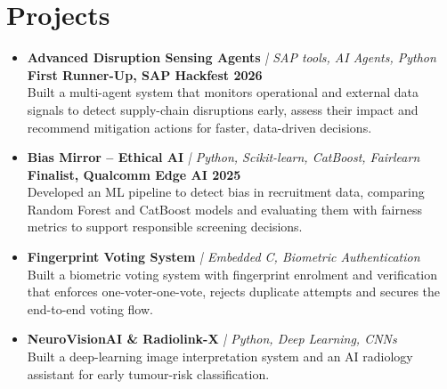 \documentclass[a4paper,10pt]{article}
\newcommand{\project}[3]{\item \textbf{#1} \textit{\small| #2} \hfill {\small\textbf{#3}}\\}
\begin{document}
\section{Projects}
\begin{itemize}

\project{Advanced Disruption Sensing Agents}{SAP tools, AI Agents, Python}{First Runner-Up, SAP Hackfest 2026}
Built a multi-agent system that monitors operational and external data signals to detect supply-chain
disruptions early, assess their impact and recommend mitigation actions for faster, data-driven decisions.

\project{Bias Mirror -- Ethical AI}{Python, Scikit-learn, CatBoost, Fairlearn}{Finalist, Qualcomm Edge AI 2025}
Developed an ML pipeline to detect bias in recruitment data, comparing Random Forest and CatBoost models
and evaluating them with fairness metrics to support responsible screening decisions.

\project{Fingerprint Voting System}{Embedded C, Biometric Authentication}{}
Built a biometric voting system with fingerprint enrolment and verification that enforces
one-voter-one-vote, rejects duplicate attempts and secures the end-to-end voting flow.

\project{NeuroVisionAI \& Radiolink-X}{Python, Deep Learning, CNNs}{}
Built a deep-learning image interpretation system and an AI radiology assistant for early tumour-risk
classification.

%
%

\end{itemize}
\end{document}
